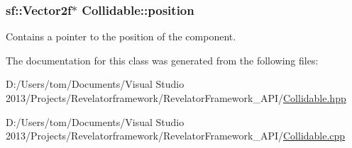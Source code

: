 \hypertarget{class_collidable_aa6c2e113d920df8c0d5da2a244f924bd}{
\subsubsection[{position}]{\setlength{\rightskip}{0pt plus 5cm}sf\-::\-Vector2f$\ast$ Collidable\-::position\hspace{0.3cm}{\ttfamily [protected]}}}\label{class_collidable_aa6c2e113d920df8c0d5da2a244f924bd}


Contains a pointer to the position of the component. 



The documentation for this class was generated from the following files\-:\begin{DoxyCompactItemize}
\item 
D\-:/\-Users/tom/\-Documents/\-Visual Studio 2013/\-Projects/\-Revelatorframework/\-Revelator\-Framework\-\_\-\-A\-P\-I/\hyperlink{_collidable_8hpp}{Collidable.\-hpp}\item 
D\-:/\-Users/tom/\-Documents/\-Visual Studio 2013/\-Projects/\-Revelatorframework/\-Revelator\-Framework\-\_\-\-A\-P\-I/\hyperlink{_collidable_8cpp}{Collidable.\-cpp}\end{DoxyCompactItemize}
